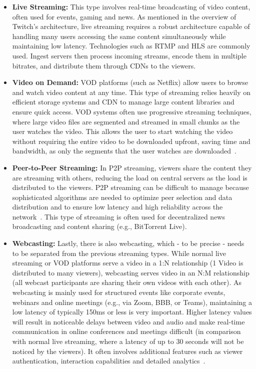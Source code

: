 \begin{itemize}
    \item \textbf{Live Streaming:} This type involves real-time broadcasting of video content, often used for events, gaming and news. As mentioned in the overview of Twitch's architecture, live streaming requires a robust architecture capable of handling many users accessing the same content simultaneously while maintaining low latency. Technologies such as \ac{RTMP} and \ac{HLS} are commonly used. Ingest servers then process incoming streams, encode them in multiple bitrates, and distribute them through \ac{CDN}s to the viewers.
    \item \textbf{Video on Demand:} \ac{VOD} platforms (such as Netflix) allow users to browse and watch video content at any time. This type of streaming relies heavily on efficient storage systems and \ac{CDN} to manage large content libraries and ensure quick access. \ac{VOD} systems often use progressive streaming techniques, where large video files are segmented and streamed in small chunks as the user watches the video. This allows the user to start watching the video without requiring the entire video to be downloaded upfront, saving time and bandwidth, as only the segments that the user watches are downloaded~\parencite{cloud_streaming_trends}.
    \item \textbf{Peer-to-Peer Streaming:} In \ac{P2P} streaming, viewers share the content they are streaming with others, reducing the load on central servers as the load is distributed to the viewers. \ac{P2P} streaming can be difficult to manage because sophisticated algorithms are needed to optimize peer selection and data distribution and to ensure low latency and high reliability across the network~\parencite{p2p}. This type of streaming is often used for decentralized news broadcasting and content sharing (e.g., BitTorrent Live).
    \item \textbf{Webcasting:} Lastly, there is also webcasting, which - to be precise - needs to be separated from the previous streaming types. While normal live streaming or \ac{VOD} platforms serve a video in a 1:N relationship (1 Video is distributed to many viewers), webcasting serves video in an N:M relationship (all webcast participants are sharing their own videos with each other). As webcasting is mainly used for structured events like corporate events, webinars and online meetings (e.g., via Zoom, BBB, or Teams), maintaining a low latency of typically 150ms or less is very important. Higher latency values will result in noticeable delays between video and audio and make real-time communication in online conferences and meetings difficult (in comparison with normal live streaming, where a latency of up to 30 seconds will not be noticed by the viewers).  
    It often involves additional features such as viewer authentication, interaction capabilities and detailed analytics~\parencite{cloud_streaming_trends}.
\end{itemize}

